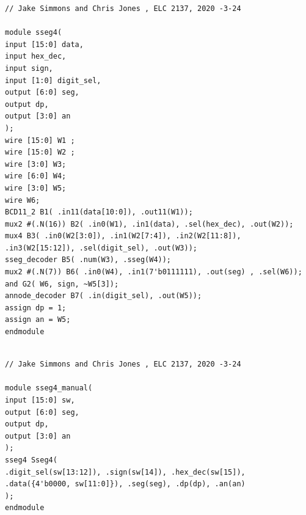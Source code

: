 \documentclass[11pt]{article}
\begin{document}
\begin{lstlisting}[style=Verilog,caption= Sseg4 Source File,label=code:ex ]
// Jake Simmons and Chris Jones , ELC 2137, 2020 -3-24

module sseg4(
input [15:0] data,
input hex_dec,
input sign,
input [1:0] digit_sel,
output [6:0] seg,
output dp,
output [3:0] an
);
wire [15:0] W1 ;
wire [15:0] W2 ;
wire [3:0] W3;
wire [6:0] W4;
wire [3:0] W5;
wire W6;
BCD11_2 B1( .in11(data[10:0]), .out11(W1));
mux2 #(.N(16)) B2( .in0(W1), .in1(data), .sel(hex_dec), .out(W2));
mux4 B3( .in0(W2[3:0]), .in1(W2[7:4]), .in2(W2[11:8]), .in3(W2[15:12]), .sel(digit_sel), .out(W3));
sseg_decoder B5( .num(W3), .sseg(W4));
mux2 #(.N(7)) B6( .in0(W4), .in1(7'b0111111), .out(seg) , .sel(W6));
and G2( W6, sign, ~W5[3]);
annode_decoder B7( .in(digit_sel), .out(W5));
assign dp = 1;
assign an = W5;
endmodule


\end{lstlisting}



\begin{lstlisting}[style=Verilog,caption=Sseg4 Manual Source File,label=code:ex ]
// Jake Simmons and Chris Jones , ELC 2137, 2020 -3-24

module sseg4_manual(
input [15:0] sw,
output [6:0] seg,
output dp,
output [3:0] an
);
sseg4 Sseg4(
.digit_sel(sw[13:12]), .sign(sw[14]), .hex_dec(sw[15]),
.data({4'b0000, sw[11:0]}), .seg(seg), .dp(dp), .an(an)
);
endmodule


\end{lstlisting}
\end{document}
